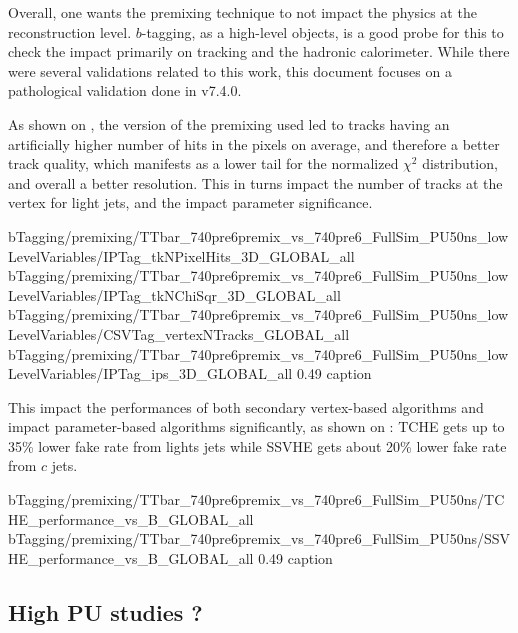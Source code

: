         Overall, one wants the premixing technique to not impact the physics at the reconstruction
        level. $b$-tagging, as a high-level objects, is a good probe for this to check
        the impact primarily on tracking and the hadronic calorimeter. While there were
        several validations related to this work, this document focuses on a pathological
        validation done in v7.4.0.

        As shown on , the version of the
        premixing used led to tracks having an artificially higher number of hits in the
        pixels on average, and therefore a better track quality, which manifests as a lower
        tail for the normalized $\chi^2$ distribution, and overall a better resolution.
        This in turns impact the number of tracks at the vertex for light jets, and the
        impact parameter significance.

                          {bTagging/premixing/TTbar_740pre6premix_vs_740pre6_FullSim_PU50ns_lowLevelVariables/IPTag_tkNPixelHits_3D_GLOBAL_all}
                          {bTagging/premixing/TTbar_740pre6premix_vs_740pre6_FullSim_PU50ns_lowLevelVariables/IPTag_tkNChiSqr_3D_GLOBAL_all}
                          {bTagging/premixing/TTbar_740pre6premix_vs_740pre6_FullSim_PU50ns_lowLevelVariables/CSVTag_vertexNTracks_GLOBAL_all}
                          {bTagging/premixing/TTbar_740pre6premix_vs_740pre6_FullSim_PU50ns_lowLevelVariables/IPTag_ips_3D_GLOBAL_all}
                          {0.49}
                          {caption}

        This impact the performances of both secondary vertex-based algorithms and impact
        parameter-based algorithms significantly, as shown on
         : TCHE gets up to 35\% lower fake
        rate from lights jets while SSVHE gets about 20\% lower fake rate from $c$ jets.

                          {bTagging/premixing/TTbar_740pre6premix_vs_740pre6_FullSim_PU50ns/TCHE_performance_vs_B_GLOBAL_all}
                          {bTagging/premixing/TTbar_740pre6premix_vs_740pre6_FullSim_PU50ns/SSVHE_performance_vs_B_GLOBAL_all}
                          {0.49}
                          {caption}

        \subsection{High PU studies ?}



